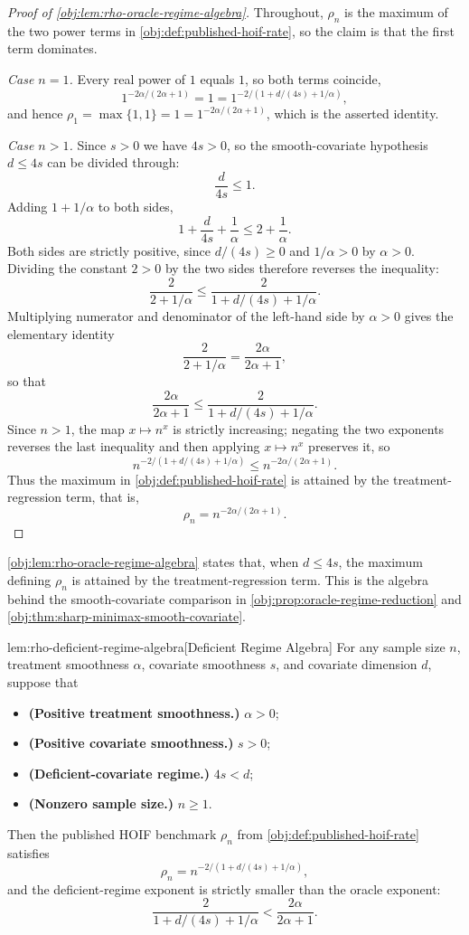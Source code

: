 \documentclass[11pt]{article}
\begin{document}
\begin{proof}[Proof of \cref{obj:lem:rho-oracle-regime-algebra}]
Throughout, \(\rho_n\) is the maximum of the two power terms in \cref{obj:def:published-hoif-rate},
so the claim is that the first term dominates.

\emph{Case \(n=1\).} Every real power of \(1\) equals \(1\), so both terms coincide,
\[
1^{-2\alpha/(2\alpha+1)}=1=1^{-2/(1+d/(4s)+1/\alpha)},
\]
and hence \(\rho_1=\max\{1,1\}=1=1^{-2\alpha/(2\alpha+1)}\), which is the asserted identity.

\emph{Case \(n>1\).} Since \(s>0\) we have \(4s>0\), so the smooth-covariate hypothesis \(d\le 4s\) can
be divided through:
\[
\frac{d}{4s}\le 1 .
\]
Adding \(1+1/\alpha\) to both sides,
\[
1+\frac d{4s}+\frac1\alpha
\le
2+\frac1\alpha .
\]
Both sides are strictly positive, since \(d/(4s)\ge0\) and \(1/\alpha>0\) by \(\alpha>0\). Dividing
the constant \(2>0\) by the two sides therefore reverses the inequality:
\[
\frac{2}{2+1/\alpha}
\le
\frac{2}{1+d/(4s)+1/\alpha}.
\]
Multiplying numerator and denominator of the left-hand side by \(\alpha>0\) gives the elementary
identity
\[
\frac{2}{2+1/\alpha}
=
\frac{2\alpha}{2\alpha+1},
\]
so that
\[
\frac{2\alpha}{2\alpha+1}
\le
\frac{2}{1+d/(4s)+1/\alpha}.
\]
Since \(n>1\), the map \(x\mapsto n^{x}\) is strictly increasing; negating the two exponents reverses
the last inequality and then applying \(x\mapsto n^{x}\) preserves it, so
\[
n^{-2/(1+d/(4s)+1/\alpha)}
\le
n^{-2\alpha/(2\alpha+1)} .
\]
Thus the maximum in \cref{obj:def:published-hoif-rate} is attained by the treatment-regression
term, that is,
\[
\rho_n=n^{-2\alpha/(2\alpha+1)} .
\]
\end{proof}

\cref{obj:lem:rho-oracle-regime-algebra} states that, when \(d\le 4s\), the maximum defining \(\rho_n\) is attained by the treatment-regression term. This is the algebra behind the smooth-covariate comparison in \cref{obj:prop:oracle-regime-reduction} and \cref{obj:thm:sharp-minimax-smooth-covariate}.

\begin{lemmav}{lem:rho-deficient-regime-algebra}[Deficient Regime Algebra]
For any sample size $n$, treatment smoothness $\alpha$, covariate smoothness $s$, and covariate dimension $d$, suppose that
\begin{itemize}
\item \textbf{(Positive treatment smoothness.)} $\alpha>0$;
\item \textbf{(Positive covariate smoothness.)} $s>0$;
\item \textbf{(Deficient-covariate regime.)} $4s<d$;
\item \textbf{(Nonzero sample size.)} $n\ge 1$.
\end{itemize}
Then the published HOIF benchmark $\rho_n$ from \cref{obj:def:published-hoif-rate} satisfies
\[
\rho_n
=
n^{-2/(1+d/(4s)+1/\alpha)},
\]
and the deficient-regime exponent is strictly smaller than the oracle exponent:
\[
\frac{2}{1+d/(4s)+1/\alpha}
<
\frac{2\alpha}{2\alpha+1}.
\]
\end{lemmav}
\end{document}
